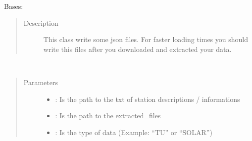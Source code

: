 \documentclass[letterpaper,10pt,english]{sphinxmanual}
\begin{document}
\begin{fulllineitems}
\label{\detokenize{DwdDataPrep:DwdDataPrep.Writer}}
\sphinxAtStartPar
Bases: 
\begin{quote}\begin{description}
\item[{Description}] \leavevmode
\sphinxAtStartPar
This class write some json files. For faster loading times you should write this files after you downloaded and extracted your data.

\end{description}\end{quote}

\begin{fulllineitems}
\label{\detokenize{DwdDataPrep:DwdDataPrep.Writer.__init__}}~\begin{quote}\begin{description}
\item[{Parameters}] \leavevmode\begin{itemize}
\item {} 
\sphinxAtStartPar
{} \textendash{} : Is the path to the txt of station descriptions / informations

\item {} 
\sphinxAtStartPar
{} \textendash{} : Is the path to the extracted\_files

\item {} 
\sphinxAtStartPar
{} \textendash{} : Is the type of data (Example: “TU” or “SOLAR”)

\end{itemize}

\end{description}\end{quote}


\end{fulllineitems}
\end{fulllineitems}
\end{document}
